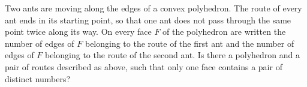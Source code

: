 Two ants are moving along the edges of a convex polyhedron. The route of every ant ends in its starting point, so that one ant does not pass through the same point twice along its way. On every face $F$ of the polyhedron are written the number of edges of $F$ belonging to the route of the first ant and the number of edges of $F$ belonging to the route of the second ant. Is there a polyhedron and a pair of routes described as above, such that only one face contains a pair of distinct numbers?


